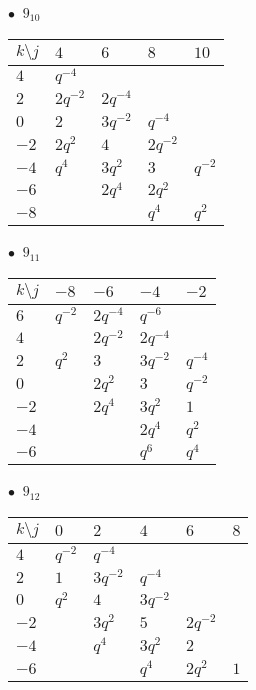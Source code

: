 %
\begin{minipage}{\linewidth}
$\bullet\ $ $9_{10}$ \vspace{0.5em} \\
\begin{tabular}{l|llll}
$k \setminus j$ & $4$ & $6$ & $8$ & $10$ \\
\hline
$4$ & $q^{-4}$ &  &  &  \\
$2$ & $2q^{-2}$ & $2q^{-4}$ &  &  \\
$0$ & $2$ & $3q^{-2}$ & $q^{-4}$ &  \\
$-2$ & $2q^{2}$ & $4$ & $2q^{-2}$ &  \\
$-4$ & $q^{4}$ & $3q^{2}$ & $3$ & $q^{-2}$ \\
$-6$ &  & $2q^{4}$ & $2q^{2}$ &  \\
$-8$ &  &  & $q^{4}$ & $q^{2}$ \\
\end{tabular}
\vspace{2em}
\end{minipage}
%
\begin{minipage}{\linewidth}
$\bullet\ $ $9_{11}$ \vspace{0.5em} \\
\begin{tabular}{l|llll}
$k \setminus j$ & $-8$ & $-6$ & $-4$ & $-2$ \\
\hline
$6$ & $q^{-2}$ & $2q^{-4}$ & $q^{-6}$ &  \\
$4$ &  & $2q^{-2}$ & $2q^{-4}$ &  \\
$2$ & $q^{2}$ & $3$ & $3q^{-2}$ & $q^{-4}$ \\
$0$ &  & $2q^{2}$ & $3$ & $q^{-2}$ \\
$-2$ &  & $2q^{4}$ & $3q^{2}$ & $1$ \\
$-4$ &  &  & $2q^{4}$ & $q^{2}$ \\
$-6$ &  &  & $q^{6}$ & $q^{4}$ \\
\end{tabular}
\vspace{2em}
\end{minipage}
%
\begin{minipage}{\linewidth}
$\bullet\ $ $9_{12}$ \vspace{0.5em} \\
\begin{tabular}{l|lllll}
$k \setminus j$ & $0$ & $2$ & $4$ & $6$ & $8$ \\
\hline
$4$ & $q^{-2}$ & $q^{-4}$ &  &  &  \\
$2$ & $1$ & $3q^{-2}$ & $q^{-4}$ &  &  \\
$0$ & $q^{2}$ & $4$ & $3q^{-2}$ &  &  \\
$-2$ &  & $3q^{2}$ & $5$ & $2q^{-2}$ &  \\
$-4$ &  & $q^{4}$ & $3q^{2}$ & $2$ &  \\
$-6$ &  &  & $q^{4}$ & $2q^{2}$ & $1$ \\
\end{tabular}
\vspace{2em}
\end{minipage}
